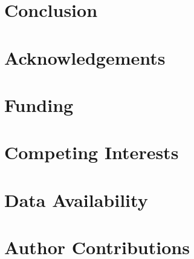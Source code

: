 \documentclass[11pt,a4paper]{article}
\begin{document}
\section{Conclusion}
\label{sec:conclusion}

\section*{Acknowledgements}

\section*{Funding}

\section*{Competing Interests}

\section*{Data Availability}

\section*{Author Contributions}


\end{document}

